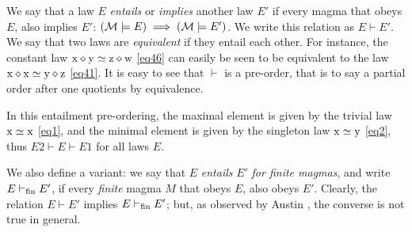 We say that a law $E$ \emph{entails} or \emph{implies} another law $E'$ if every magma that obeys $E$, also implies $E'$: $({\mathcal{M}} \models E) \implies ({\mathcal{M}} \models E')$.  We write this relation as $E \vdash E'$. We say that two laws are \emph{equivalent} if they entail each other. For instance, the constant law $\mathrm{x} \diamond \mathrm{y} \simeq \mathrm{z} \diamond \mathrm{w}$ \eqref{eq46} can easily be seen to be equivalent to the law $\mathrm{x} \diamond \mathrm{x} \simeq \mathrm{y} \diamond \mathrm{z}$ \eqref{eq41}.  It is easy to see that $\vdash$ is a pre-order, that is to say a partial order after one quotients by equivalence.

In this entailment pre-ordering, the maximal element is given by the trivial law $\mathrm{x}\simeq\mathrm{x}$ \eqref{eq1}, and the minimal element is given by the singleton law $\mathrm{x}\simeq \mathrm{y}$ \eqref{eq2}, thus $E2 \vdash E \vdash E1$ for all laws $E$.

We also define a variant: we say that $E$ \emph{entails} $E'$ \emph{for finite magmas}, and write $E \vdash_{\mathrm{fin}} E'$, if every \emph{finite} magma $M$ that obeys $E$, also obeys $E'$.  Clearly, the relation $E \vdash E'$ implies $E \vdash_{\mathrm{fin}} E'$; but, as observed by Austin \cite{austin_finite}, the converse is not true in general.

